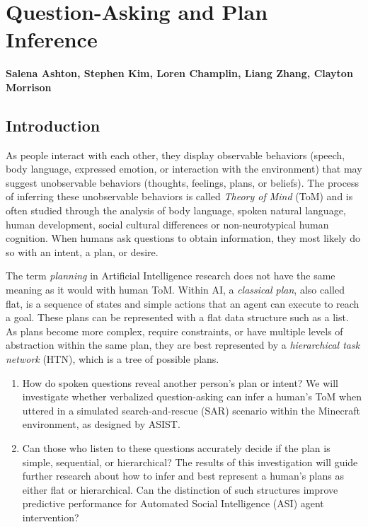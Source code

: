\chapter{Question-Asking and Plan Inference}
\label{ch:question_plan}
\textbf{Salena Ashton, Stephen Kim, Loren Champlin, Liang Zhang, Clayton Morrison}

\section{Introduction}

As people interact with each other, they display observable behaviors (speech,
body language, expressed emotion, or interaction with the environment) that may
suggest unobservable behaviors (thoughts, feelings, plans, or beliefs). The
process of inferring these unobservable behaviors is called \textit{Theory of
Mind} (ToM) and is often studied through the analysis of body language, spoken natural language, human development, social cultural differences or non-neurotypical human cognition. When humans ask questions to obtain information, they most likely do so with an intent, a plan, or desire.

The term \textit{planning} in Artificial Intelligence research does not have
the same meaning as it would with human ToM. Within AI, a \textit{classical
plan}, also called flat, is a sequence of states and simple actions that an
agent can execute to reach a goal. These plans can be represented with a flat
data structure such as a list. As plans become more complex, require
constraints, or have multiple levels of abstraction within the same plan, they
are best represented by a \textit{hierarchical task network} (HTN), which is a tree of possible plans.
\vspace{15pt}

\begin{enumerate}
    \item How do spoken questions reveal another person’s plan or intent? We will investigate whether verbalized question-asking can infer a human’s ToM
when uttered in a simulated search-and-rescue (SAR) scenario within the
Minecraft environment, as designed by ASIST.
    \item Can those who listen to these questions accurately decide if the plan is simple, sequential, or hierarchical? The results of this investigation will guide further research about how to
infer and best represent a human's plans as either flat or hierarchical. Can
the distinction of such structures improve predictive performance for Automated
Social Intelligence (ASI) agent intervention?
\end{enumerate}

